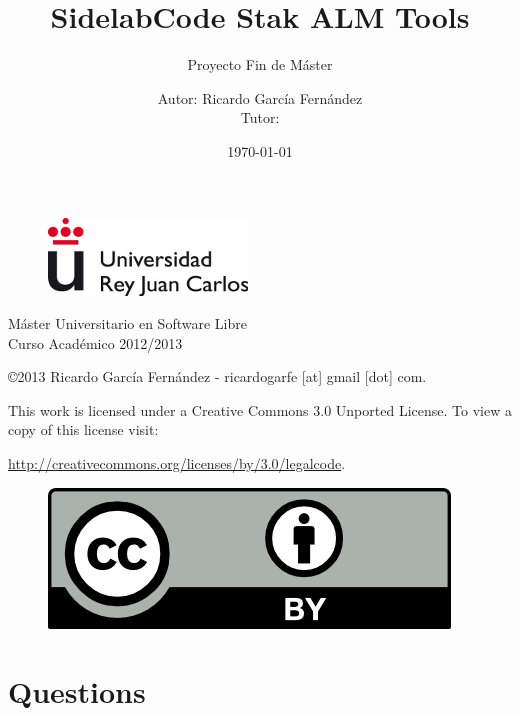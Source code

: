 \documentclass[11pt]{scrartcl}
\title{\textbf{SidelabCode Stak ALM Tools}}
\subtitle{Proyecto Fin de M\'aster}
\author{Autor: Ricardo Garc\'ia Fern\'andez
\\Tutor: }
\date{\today}
\begin{document}
\maketitle

\begin{figure}[h]
    \begin{center}
        \includegraphics{urjc}
        \label{fig:by}
    \end{center}
\end{figure}

\vspace{4cm}

\begin{center}
\large
M\'aster Universitario en Software Libre
\\Curso Acad\'emico 2012/2013
\end{center}

\vfill

\begin{flushright}
    \copyright  2013 Ricardo Garc\'ia Fern\'andez - ricardogarfe [at] gmail [dot] com.

    This work is licensed under a Creative Commons 3.0 Unported License.
    To view a copy of this license visit:
 
    \url{http://creativecommons.org/licenses/by/3.0/legalcode}.
\end{flushright}

\begin{figure}[h]
    \begin{flushright}	
        \includegraphics{by}
        \label{fig:by}
    \end{flushright}
\end{figure}

\newpage

\section{Questions}
\end{document}
